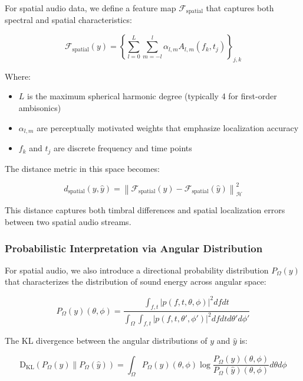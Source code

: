 For spatial audio data, we define a feature map $\mathcal{F}_{\text{spatial}}$ that captures both spectral and spatial characteristics:

\begin{equation}
\mathcal{F}_{\text{spatial}}(y) = \left\{ \sum_{l=0}^{L} \sum_{m=-l}^{l} \alpha_{l,m} A_{l,m}(f_k,t_j) \right\}_{j,k}
\end{equation}

Where:
\begin{itemize}
\item $L$ is the maximum spherical harmonic degree (typically 4 for first-order ambisonics)
\item $\alpha_{l,m}$ are perceptually motivated weights that emphasize localization accuracy
\item $f_k$ and $t_j$ are discrete frequency and time points
\end{itemize}

The distance metric in this space becomes:

\begin{equation}
d_{\text{spatial}}(y, \hat{y}) = \left\| \mathcal{F}_{\text{spatial}}(y) - \mathcal{F}_{\text{spatial}}(\hat{y}) \right\|_{\mathcal{H}}^2
\end{equation}

This distance captures both timbral differences and spatial localization errors between two spatial audio streams.

\subsubsection{Probabilistic Interpretation via Angular Distribution}

For spatial audio, we also introduce a directional probability distribution $P_{\Omega}(y)$ that characterizes the distribution of sound energy across angular space:

\begin{equation}
P_{\Omega}(y)(\theta,\phi) = \frac{\int_{f,t} |p(f,t,\theta,\phi)|^2 df dt}{\int_{\Omega} \int_{f,t} |p(f,t,\theta',\phi')|^2 df dt d\theta' d\phi'}
\end{equation}

The KL divergence between the angular distributions of $y$ and $\hat{y}$ is:

\begin{equation}
\mathrm{D_{KL}}(P_{\Omega}(y) \| P_{\Omega}(\hat{y})) = \int_{\Omega} P_{\Omega}(y)(\theta,\phi) \log\frac{P_{\Omega}(y)(\theta,\phi)}{P_{\Omega}(\hat{y})(\theta,\phi)} d\theta d\phi
\end{equation}

